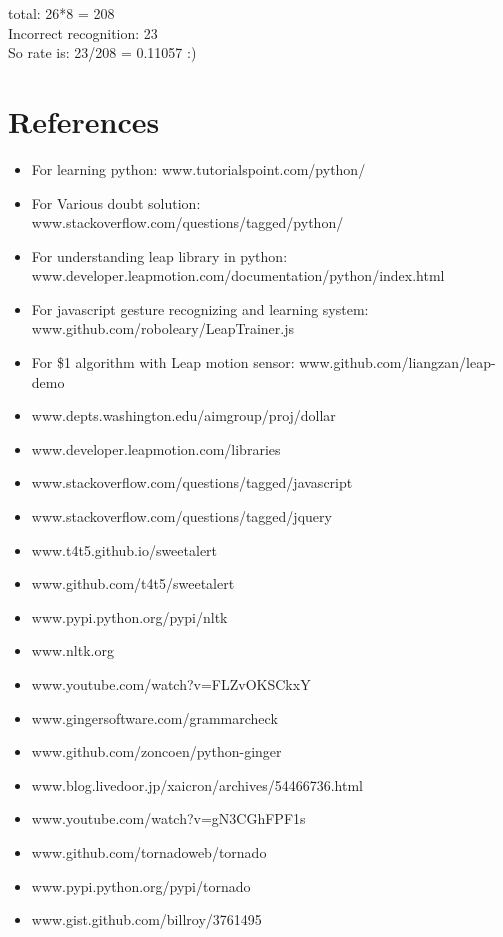 \documentclass[11pt,a4paper]{article}
\begin{document}
    \vspace{.3cm}
	total: 26*8 =  208\\
	Incorrect recognition: 23\\
	So rate is: 23/208 = 0.11057    :)
	\section{References}
    \begin{itemize}
        \item For learning python:  www.tutorialspoint.com/python/
        \item For Various doubt solution:  www.stackoverflow.com/questions/tagged/python/
        \item For understanding leap library in python: www.developer.leapmotion.com/documentation/python/index.html
        \item For javascript gesture recognizing and learning system:  www.github.com/roboleary/LeapTrainer.js
        \item For \$1 algorithm with Leap motion sensor:  www.github.com/liangzan/leap-demo
        \item  www.depts.washington.edu/aimgroup/proj/dollar
        \item  www.developer.leapmotion.com/libraries
        \item  www.stackoverflow.com/questions/tagged/javascript
        \item  www.stackoverflow.com/questions/tagged/jquery
        \item  www.t4t5.github.io/sweetalert
        \item  www.github.com/t4t5/sweetalert
        \item  www.pypi.python.org/pypi/nltk
        \item  www.nltk.org
        \item  www.youtube.com/watch?v=FLZvOKSCkxY
        \item  www.gingersoftware.com/grammarcheck
        \item  www.github.com/zoncoen/python-ginger
        \item  www.blog.livedoor.jp/xaicron/archives/54466736.html
        \item  www.youtube.com/watch?v=gN3CGhFPF1s
        \item  www.github.com/tornadoweb/tornado
        \item  www.pypi.python.org/pypi/tornado
        \item  www.gist.github.com/billroy/3761495

\end{itemize}
\end{document}

